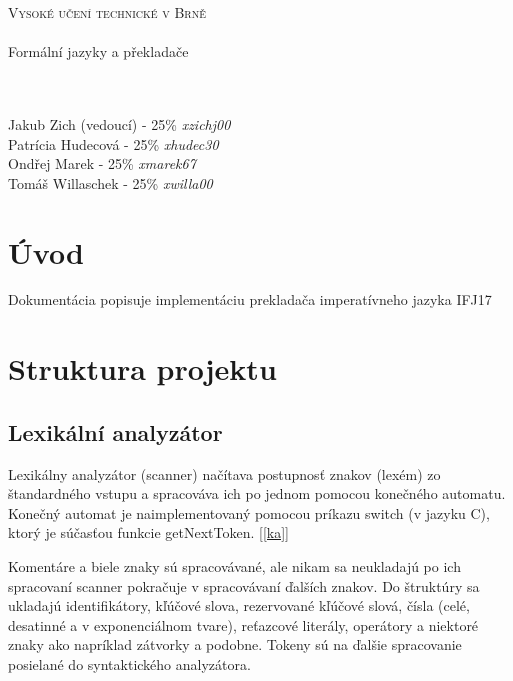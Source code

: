 \documentclass[11pt, a4paper]{article}
\begin{document}
	\begin{titlepage}
		\begin{center}
			 \textsc{{\Huge Vysoké učení technické v Brně}\\ 
			 \vspace{8.5pt}{\huge Fakulta informačních technologií}}\\
			{\LARGE Formální jazyky a překladače\\}
				\vspace{5pt}{\Huge Dokumentace ke skupinovému projektu IFJ a IAL}\\
				\vspace{2pt}{\Large Tým 47, varianta I}
			\\
		\end{center}
		{\small Jakub Zich (vedoucí) - 25\% \emph{xzichj00} \hfill \\
		Patrícia Hudecová - 25\% \emph{xhudec30} \hfill \\
		Ondřej Marek - 25\% \emph{xmarek67} \hfill\\
		Tomáš Willaschek - 25\% \emph{xwilla00} \hfill }
	
	\end{titlepage}	
   
\tableofcontents
\cleardoublepage
\thispagestyle{empty}  

       
 
\section{Úvod} 

Dokumentácia popisuje implementáciu prekladača imperatívneho jazyka IFJ17
	\section{Struktura projektu}
	
	\subsection{Lexikální analyzátor}
Lexikálny analyzátor (scanner) načítava postupnosť znakov (lexém) zo štandardného vstupu a spracováva ich po jednom  pomocou konečného automatu. Konečný automat je naimplementovaný pomocou príkazu switch  (v jazyku C), ktorý je súčasťou funkcie getNextToken. [\ref{ka}]


Komentáre a biele znaky sú spracovávané, ale nikam sa neukladajú po ich spracovaní scanner pokračuje v spracovávaní ďalších znakov. Do štruktúry sa ukladajú identifikátory, kľúčové slova, rezervované kľúčové slová,  čísla (celé, desatinné a v exponenciálnom tvare), reťazcové literály, operátory a niektoré znaky ako napríklad zátvorky a podobne. Tokeny sú na ďalšie spracovanie posielané do syntaktického analyzátora. 
\end{document}
